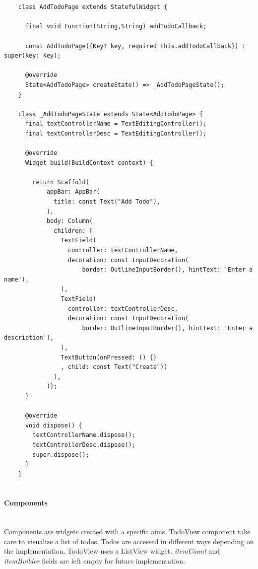 	\mbox{}\\
	\begin{code}
	 \mbox{}
			\label{code:2.8}

	\begin{verbatim}
	
	class AddTodoPage extends StatefulWidget {
	
	  final void Function(String,String) addTodoCallback;
	
	  const AddTodoPage({Key? key, required this.addTodoCallback}) : super(key: key);
	
	  @override
	  State<AddTodoPage> createState() => _AddTodoPageState();
	}
	
	class _AddTodoPageState extends State<AddTodoPage> {
	  final textControllerName = TextEditingController();
	  final textControllerDesc = TextEditingController();
	
	  @override
	  Widget build(BuildContext context) {
	
	    return Scaffold(
	        appBar: AppBar(
	          title: const Text("Add Todo"),
	        ),
	        body: Column(
	          children: [
	            TextField(
	              controller: textControllerName,
	              decoration: const InputDecoration(
	                  border: OutlineInputBorder(), hintText: 'Enter a name'),
	            ),
	            TextField(
	              controller: textControllerDesc,
	              decoration: const InputDecoration(
	                  border: OutlineInputBorder(), hintText: 'Enter a description'),
	            ),
	            TextButton(onPressed: () {}
	            , child: const Text("Create"))
	          ],
	        ));
	  }
	
	  @override
	  void dispose() {
	    textControllerName.dispose();
	    textControllerDesc.dispose();
	    super.dispose();
	  }
	}
	
	\end{verbatim}
	\end{code}
	\mbox{}
	
	
	\paragraph{Components} \mbox{} \\
	\label{par:todo_app_components}
	Components are widgets created with a specific aims.
	TodoView component take care to visualize a list of todos. Todos are accessed in different ways depending on the implementation. TodoView uses a ListView widget. \textit{itemCount} and \textit{itemBuilder} fields are left empty for future implementation.
	
